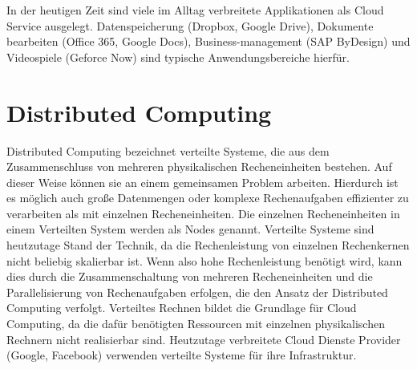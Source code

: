 In der heutigen Zeit sind viele im Alltag verbreitete Applikationen als Cloud Service ausgelegt. Datenspeicherung (Dropbox, Google Drive), Dokumente bearbeiten (Office 365, Google Docs), Business-management (SAP ByDesign) und Videospiele (Geforce Now) sind typische Anwendungsbereiche hierfür. 

\section{Distributed Computing}

Distributed Computing bezeichnet verteilte Systeme, die aus dem Zusammenschluss von mehreren physikalischen Recheneinheiten bestehen. Auf dieser Weise können sie an einem gemeinsamen Problem arbeiten. Hierdurch ist es möglich auch große Datenmengen oder komplexe Rechenaufgaben effizienter zu verarbeiten als mit einzelnen Recheneinheiten. \cite{AWS2023} Die einzelnen Recheneinheiten in einem Verteilten System werden als Nodes genannt. \cite{ord1994scale} Verteilte Systeme sind heutzutage Stand der Technik, da die Rechenleistung von einzelnen Rechenkernen nicht beliebig skalierbar ist. Wenn also hohe Rechenleistung benötigt wird, kann dies  durch die Zusammenschaltung von mehreren Recheneinheiten und die Parallelisierung von Rechenaufgaben erfolgen, die den Ansatz der Distributed Computing verfolgt. Verteiltes Rechnen bildet die Grundlage für Cloud Computing, da die dafür benötigten Ressourcen mit einzelnen physikalischen Rechnern nicht realisierbar sind. Heutzutage verbreitete Cloud Dienste Provider (Google, Facebook) verwenden verteilte Systeme für ihre Infrastruktur. \cite{arpaci2018operating} 

